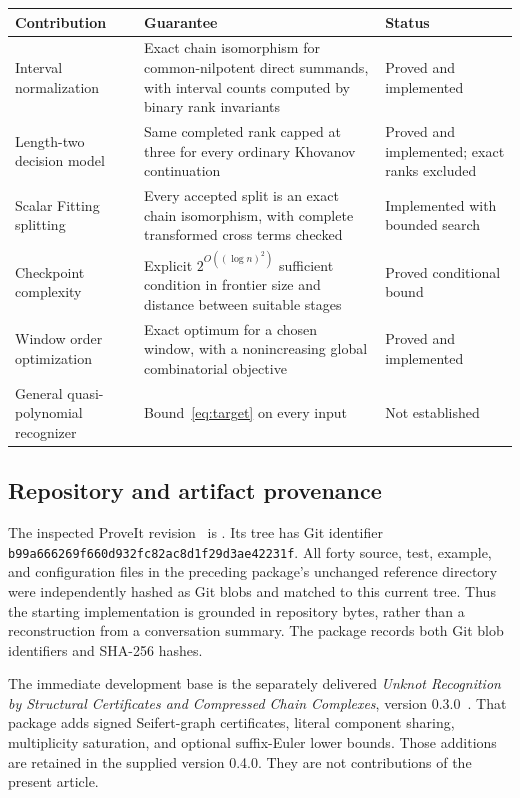 \begin{center}\small
\begin{tabularx}{\textwidth}{@{}>{\raggedright\arraybackslash}p{}Y>{\raggedright\arraybackslash}p{.23\textwidth}@{}}
\toprule
Contribution & Guarantee & Status\\
\midrule
Interval normalization & Exact chain isomorphism for common-nilpotent direct
summands, with interval counts computed by binary rank invariants & Proved and implemented\\
Length-two decision model & Same completed rank capped at three for every
ordinary Khovanov continuation & Proved and implemented; exact ranks excluded\\
Scalar Fitting splitting & Every accepted split is an exact chain isomorphism,
with complete transformed cross terms checked & Implemented with bounded search\\
Checkpoint complexity & Explicit $2^{O((\log n)^2)}$ sufficient condition in
frontier size and distance between suitable stages & Proved conditional bound\\
Window order optimization & Exact optimum for a chosen window, with a
nonincreasing global combinatorial objective & Proved and implemented\\
General quasi-polynomial recognizer & Bound~\eqref{eq:target} on every input & Not established\\
\bottomrule
\end{tabularx}
\end{center}

\subsection{Repository and artifact provenance}
The inspected ProveIt revision~\cite{proveit} is \pin. Its
 tree has Git identifier
\nolinkurl{b99a666269f660d932fc82ac8d1f29d3ae42231f}.
All forty source, test, example, and configuration files in the preceding
package's unchanged reference directory were independently hashed as Git
blobs and matched to this current tree. Thus the starting implementation is
grounded in repository bytes, rather than a reconstruction from a conversation
summary. The package records both Git blob identifiers and SHA-256 hashes.

The immediate development base is the separately delivered
\emph{Unknot Recognition by Structural Certificates and Compressed Chain
Complexes}, version 0.3.0~\cite{prior}. That package adds signed Seifert-graph
certificates, literal component sharing, multiplicity saturation, and optional
suffix-Euler lower bounds. Those additions are retained in the supplied
version 0.4.0. They are not contributions of the present article.

